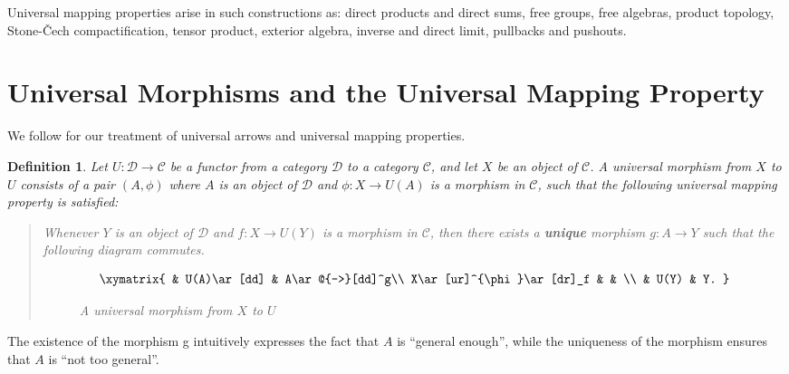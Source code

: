 \documentclass[12pt]{article}
\newtheorem{defn}[thm]{Definition}
\begin{document}
Universal mapping properties arise in such constructions
as: direct products and direct sums, free groups, free algebras, product topology,
Stone-\v{C}ech compactification, tensor product, exterior algebra, inverse and direct limit, 
pullbacks and pushouts.

\section{Universal Morphisms and the Universal Mapping Property}

We follow \cite[III.1]{MacLane} for our treatment of universal arrows and 
universal mapping properties.

\begin{defn}
Let $U: \mathcal{D} \to \mathcal{C}$ be a functor from a category
$\mathcal{D}$ to a category $\mathcal{C}$, and let $X$ be an
object of $\mathcal{C}$. A \emph{universal morphism} from $X$ to $U$
consists of a pair $(A, \phi)$ where $A$ is an object of $\mathcal{D}$
and $\phi : X \to U(A)$ is a morphism in $\mathcal{C}$, such
that the following \emph{universal mapping property} is satisfied: 
\begin{quote}
  Whenever $Y$ is an object of $\mathcal{D}$ and $f \colon X \to U(Y)$ is a
  morphism in $\mathcal{C}$, then there exists a \textbf{unique} morphism 
  $g:A\to Y$ such that the following diagram commutes.
  \begin{figure}[h]
    \[\xymatrix{
                         & U(A)\ar[dd] &  A\ar@{-->}[dd]^g\\
         X\ar[ur]^{\phi}\ar[dr]_f &			   & 			\\
         				 & U(Y)	       & Y.           
    }\]
    \caption{A universal morphism from $X$ to $U$}
  \end{figure}
\end{quote}
\end{defn}

The existence of the morphism g intuitively expresses the fact
that $A$ is ``general enough'', while the uniqueness of the morphism
ensures that $A$ is ``not too general''.
\end{document}
